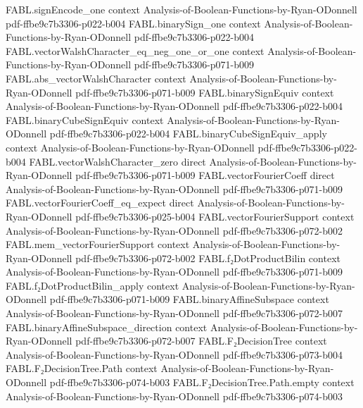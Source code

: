 \begin{theorem}
\proofstep
  {FABL.signEncode_one}
  {context}
  {Analysis-of-Boolean-Functions-by-Ryan-ODonnell}
  {pdf-ffbe9c7b3306-p022-b004}
\proofstep
  {FABL.binarySign_one}
  {context}
  {Analysis-of-Boolean-Functions-by-Ryan-ODonnell}
  {pdf-ffbe9c7b3306-p022-b004}
\proofstep
  {FABL.vectorWalshCharacter_eq_neg_one_or_one}
  {context}
  {Analysis-of-Boolean-Functions-by-Ryan-ODonnell}
  {pdf-ffbe9c7b3306-p071-b009}
\proofstep
  {FABL.abs_vectorWalshCharacter}
  {context}
  {Analysis-of-Boolean-Functions-by-Ryan-ODonnell}
  {pdf-ffbe9c7b3306-p071-b009}
\proofstep
  {FABL.binarySignEquiv}
  {context}
  {Analysis-of-Boolean-Functions-by-Ryan-ODonnell}
  {pdf-ffbe9c7b3306-p022-b004}
\proofstep
  {FABL.binaryCubeSignEquiv}
  {context}
  {Analysis-of-Boolean-Functions-by-Ryan-ODonnell}
  {pdf-ffbe9c7b3306-p022-b004}
\proofstep
  {FABL.binaryCubeSignEquiv_apply}
  {context}
  {Analysis-of-Boolean-Functions-by-Ryan-ODonnell}
  {pdf-ffbe9c7b3306-p022-b004}
\proofstep
  {FABL.vectorWalshCharacter_zero}
  {direct}
  {Analysis-of-Boolean-Functions-by-Ryan-ODonnell}
  {pdf-ffbe9c7b3306-p071-b009}
\proofstep
  {FABL.vectorFourierCoeff}
  {direct}
  {Analysis-of-Boolean-Functions-by-Ryan-ODonnell}
  {pdf-ffbe9c7b3306-p071-b009}
\proofstep
  {FABL.vectorFourierCoeff_eq_expect}
  {direct}
  {Analysis-of-Boolean-Functions-by-Ryan-ODonnell}
  {pdf-ffbe9c7b3306-p025-b004}
\proofstep
  {FABL.vectorFourierSupport}
  {context}
  {Analysis-of-Boolean-Functions-by-Ryan-ODonnell}
  {pdf-ffbe9c7b3306-p072-b002}
\proofstep
  {FABL.mem_vectorFourierSupport}
  {context}
  {Analysis-of-Boolean-Functions-by-Ryan-ODonnell}
  {pdf-ffbe9c7b3306-p072-b002}
\proofstep
  {FABL.f₂DotProductBilin}
  {context}
  {Analysis-of-Boolean-Functions-by-Ryan-ODonnell}
  {pdf-ffbe9c7b3306-p071-b009}
\proofstep
  {FABL.f₂DotProductBilin_apply}
  {context}
  {Analysis-of-Boolean-Functions-by-Ryan-ODonnell}
  {pdf-ffbe9c7b3306-p071-b009}
\proofstep
  {FABL.binaryAffineSubspace}
  {context}
  {Analysis-of-Boolean-Functions-by-Ryan-ODonnell}
  {pdf-ffbe9c7b3306-p072-b007}
\proofstep
  {FABL.binaryAffineSubspace_direction}
  {context}
  {Analysis-of-Boolean-Functions-by-Ryan-ODonnell}
  {pdf-ffbe9c7b3306-p072-b007}
\proofstep
  {FABL.F₂DecisionTree}
  {context}
  {Analysis-of-Boolean-Functions-by-Ryan-ODonnell}
  {pdf-ffbe9c7b3306-p073-b004}
\proofstep
  {FABL.F₂DecisionTree.Path}
  {context}
  {Analysis-of-Boolean-Functions-by-Ryan-ODonnell}
  {pdf-ffbe9c7b3306-p074-b003}
\proofstep
  {FABL.F₂DecisionTree.Path.empty}
  {context}
  {Analysis-of-Boolean-Functions-by-Ryan-ODonnell}
  {pdf-ffbe9c7b3306-p074-b003}
\proofstep

\end{theorem}

